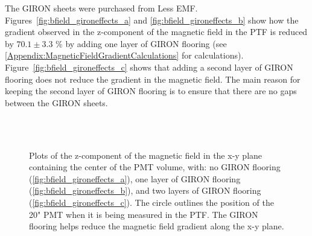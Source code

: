 The GIRON sheets were purchased from Less EMF. Figures~\ref{fig:bfield_gironeffects_a} and \ref{fig:bfield_gironeffects_b} show how the gradient observed in the z-component of the magnetic field in the PTF is reduced by $ 70.1\pm3.3 $ \% by adding one layer of GIRON flooring (see \ref{Appendix:MagneticFieldGradientCalculations} for calculations).
Figure~\ref{fig:bfield_gironeffects_c} shows that adding a second layer of GIRON flooring does not reduce the gradient in the magnetic field. The main reason for keeping the second layer of GIRON flooring is to ensure that there are no gaps between the GIRON sheets.
%
\begin{figure}[htbp]
  \begin{center}
    \vspace{-10 mm}
    \\
    \vspace{-3 mm}
    \\
    \vspace{-3 mm}
  \caption{Plots of the z-component of the magnetic field in the x-y plane containing the center of the PMT volume, with: no GIRON flooring (\ref{fig:bfield_gironeffects_a}), one layer of GIRON flooring (\ref{fig:bfield_gironeffects_b}), and two layers of GIRON flooring (\ref{fig:bfield_gironeffects_c}). The circle outlines the position of the 20" PMT when it is being measured in the PTF. The GIRON flooring helps reduce the magnetic field gradient along the x-y plane.}
  \label{fig:bfield_gironeffects}
  \end{center}
\end{figure}
%

